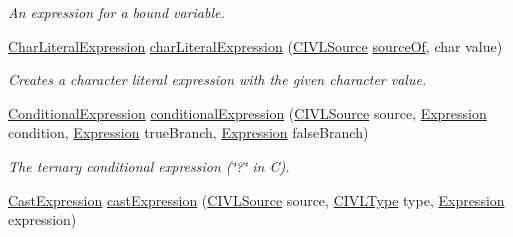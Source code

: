 \begin{DoxyCompactItemize}
\begin{DoxyCompactList}\small\item\em An expression for a bound variable. \end{DoxyCompactList}\item 
\hyperlink{interfaceedu_1_1udel_1_1cis_1_1vsl_1_1civl_1_1model_1_1IF_1_1expression_1_1CharLiteralExpression}{Char\+Literal\+Expression} \hyperlink{interfaceedu_1_1udel_1_1cis_1_1vsl_1_1civl_1_1model_1_1IF_1_1ModelFactory_a9b96cdcbe18ce844d72a1c3a065ac5b9}{char\+Literal\+Expression} (\hyperlink{interfaceedu_1_1udel_1_1cis_1_1vsl_1_1civl_1_1model_1_1IF_1_1CIVLSource}{C\+I\+V\+L\+Source} \hyperlink{interfaceedu_1_1udel_1_1cis_1_1vsl_1_1civl_1_1model_1_1IF_1_1ModelFactory_a560445f5ed48add351aa4b2f120f0c8e}{source\+Of}, char value)
\begin{DoxyCompactList}\small\item\em Creates a character literal expression with the given character value. \end{DoxyCompactList}\item 
\hyperlink{interfaceedu_1_1udel_1_1cis_1_1vsl_1_1civl_1_1model_1_1IF_1_1expression_1_1ConditionalExpression}{Conditional\+Expression} \hyperlink{interfaceedu_1_1udel_1_1cis_1_1vsl_1_1civl_1_1model_1_1IF_1_1ModelFactory_a2614b0d89b7c73154c0d448d52c7d2e7}{conditional\+Expression} (\hyperlink{interfaceedu_1_1udel_1_1cis_1_1vsl_1_1civl_1_1model_1_1IF_1_1CIVLSource}{C\+I\+V\+L\+Source} source, \hyperlink{interfaceedu_1_1udel_1_1cis_1_1vsl_1_1civl_1_1model_1_1IF_1_1expression_1_1Expression}{Expression} condition, \hyperlink{interfaceedu_1_1udel_1_1cis_1_1vsl_1_1civl_1_1model_1_1IF_1_1expression_1_1Expression}{Expression} true\+Branch, \hyperlink{interfaceedu_1_1udel_1_1cis_1_1vsl_1_1civl_1_1model_1_1IF_1_1expression_1_1Expression}{Expression} false\+Branch)
\begin{DoxyCompactList}\small\item\em The ternary conditional expression (\char`\"{}?\char`\"{} in C). \end{DoxyCompactList}\item 
\hyperlink{interfaceedu_1_1udel_1_1cis_1_1vsl_1_1civl_1_1model_1_1IF_1_1expression_1_1CastExpression}{Cast\+Expression} \hyperlink{interfaceedu_1_1udel_1_1cis_1_1vsl_1_1civl_1_1model_1_1IF_1_1ModelFactory_a9e12fab70d22c8132213f86096e33448}{cast\+Expression} (\hyperlink{interfaceedu_1_1udel_1_1cis_1_1vsl_1_1civl_1_1model_1_1IF_1_1CIVLSource}{C\+I\+V\+L\+Source} source, \hyperlink{interfaceedu_1_1udel_1_1cis_1_1vsl_1_1civl_1_1model_1_1IF_1_1type_1_1CIVLType}{C\+I\+V\+L\+Type} type, \hyperlink{interfaceedu_1_1udel_1_1cis_1_1vsl_1_1civl_1_1model_1_1IF_1_1expression_1_1Expression}{Expression} expression)

\end{DoxyCompactItemize}
